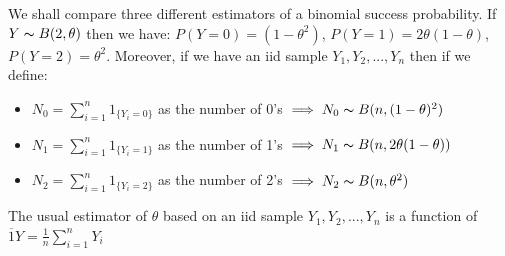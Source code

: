 \documentclass[12pt, a4paper]{article}\usepackage[]{graphicx}\usepackage[]{color}
\begin{document}


\pagestyle{default}
\thispagestyle{empty}

\newpage
\setcounter{page}{1}
We shall compare three different estimators of a binomial success probability. If $Y \thicksim B(2, \theta)$ then we have: $P(Y = 0) = (1 - \theta^2)$, $P(Y = 1) = 2\theta(1 - \theta)$, $P(Y = 2) = \theta^2$. Moreover, if we have an iid sample $Y_1, Y_2,..., Y_n$ then if we define:

\begin{itemize}
  \item $N_0 = \sum_{i = 1}^n1_{\{Y_i = 0\}}$ as the number of 0's $\implies N_0 \thicksim B(n, (1 - \theta)^2)$
  \item $N_1 = \sum_{i = 1}^n1_{\{Y_i = 1\}}$ as the number of 1's  $\implies N_1\thicksim B(n, 2\theta(1 - \theta))$
  \item $N_2 = \sum_{i = 1}^n1_{\{Y_i = 2\}}$ as the number of 2's $\implies N_2 \thicksim B(n, \theta^2)$
\end{itemize}

The usual estimator of $\theta$ based on an iid sample $Y_1, Y_2, ... , Y_n$ is a function of $\overbar{1}{Y}= \frac{1}{n}\sum_{i = 1}^nY_i$
\end{document}
